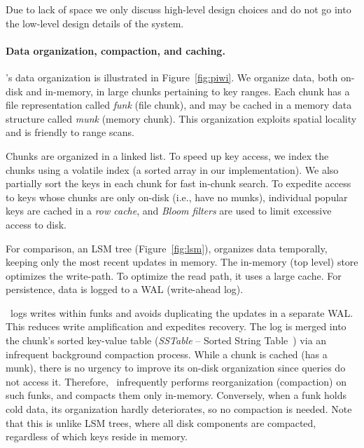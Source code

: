 
Due to lack of space we only discuss high-level design choices and do not go into the low-level design details of the system.

\paragraph{Data organization, compaction, and caching.}
\sys's data organization is illustrated in Figure~\ref{fig:piwi}. 
We organize data, both on-disk and in-memory, in large chunks pertaining to  key ranges.  
Each chunk has a file representation called  \emph{funk} (file chunk), and may be cached in a  memory data structure called \emph{munk} (memory chunk).
This organization exploits spatial locality and is friendly to range scans.

Chunks are organized in a linked list. To speed up key access, 
we index the chunks using a volatile index (a sorted array in our implementation).  
We also partially sort the keys in each chunk for fast in-chunk search.  
 To expedite access to  keys whose chunks are only on-disk  (i.e., have no munks), 
individual popular keys are cached in a \emph{row cache}, 
and \emph{Bloom filters} are used to limit excessive access to disk. 

For comparison, an LSM tree (Figure~\ref{fig:lsm}), organizes data temporally, keeping only the most recent updates in memory.
The in-memory (top level) store optimizes the write-path. To optimize the read path, it uses a large cache.   
For persistence, data is logged to a WAL (write-ahead log). 

\sys\ logs writes within funks and avoids duplicating the updates  in a separate WAL. This reduces write amplification and expedites recovery. 
The  log is merged into the chunk's sorted key-value table (\emph{SSTable} -- Sorted String Table~\cite{Bigtable2008}) 
via an infrequent background compaction process. 
While a chunk is cached (has a munk), there is no urgency to improve its on-disk organization since 
queries do not access it. Therefore, \sys\ infrequently performs reorganization (compaction) on such funks,
and compacts them only in-memory.
Conversely, when a funk holds cold data, its organization hardly deteriorates, so no compaction is needed.
Note that this is unlike LSM trees, where all disk components are compacted, regardless of which keys reside in memory.

